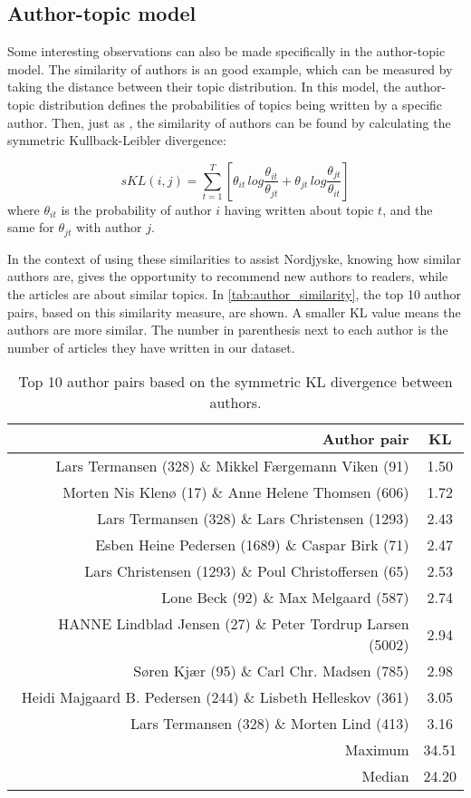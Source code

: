 \subsection{Author-topic model}\label{sec:discussion_author_topic}
Some interesting observations can also be made specifically in the author-topic model.
The similarity of authors is an good example, which can be measured by taking the distance between their topic distribution. 
In this model, the author-topic distribution defines the probabilities of topics being written by a specific author.
Then, just as \citet{author_topic_2012}, the similarity of authors can be found by calculating the symmetric Kullback-Leibler divergence:

\begin{equation} \label{eq:author_similarity}
	sKL(i,j) = \sum_{t=1}^{T}\left[\theta_{it}\, log \frac{\theta_{it}}{\theta_{jt}} + \theta_{jt}\, log \frac{\theta_{jt}}{\theta_{it}}\right]
\end{equation}
\noindent where $\theta_{it}$ is the probability of author $i$ having written about topic $t$, and the same for $\theta_{jt}$ with author $j$.

In the context of using these similarities to assist Nordjyske, knowing how similar authors are, gives the opportunity to recommend new authors to readers, while the articles are about similar topics.
In \autoref{tab:author_similarity}, the top 10 author pairs, based on this similarity measure, are shown.
A smaller KL value means the authors are more similar.
The number in parenthesis next to each author is the number of articles they have written in our dataset.

\begin{table}[h]
	\centering
	\caption{Top 10 author pairs based on the symmetric KL divergence between authors.}
	\begin{tabular}{r|c}
		Author pair & KL \\
		\midrule
		Lars Termansen (328) \& Mikkel Færgemann Viken (91) & 1.50 \\
		Morten Nis Klenø (17) \& Anne Helene Thomsen (606) & 1.72 \\
		Lars Termansen (328) \& Lars Christensen (1293) & 2.43 \\
		Esben Heine Pedersen (1689) \& Caspar Birk (71) & 2.47 \\
		Lars Christensen (1293) \& Poul Christoffersen (65) & 2.53 \\
		Lone Beck (92) \& Max Melgaard (587) & 2.74 \\
		HANNE Lindblad Jensen (27) \& Peter Tordrup Larsen (5002) & 2.94 \\
		Søren Kjær (95) \& Carl Chr. Madsen (785) & 2.98 \\
		Heidi Majgaard B. Pedersen (244) \& Lisbeth Helleskov (361) & 3.05 \\
		Lars Termansen (328) \& Morten Lind (413) & 3.16 \\
		\midrule
		Maximum & 34.51 \\
		Median & 24.20 \\
	\end{tabular}
	\label{tab:author_similarity}
\end{table}

